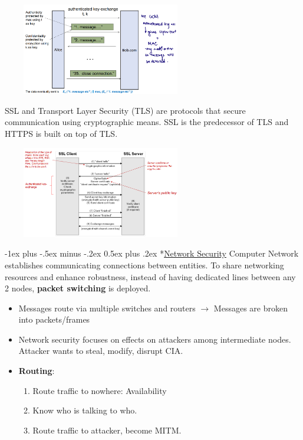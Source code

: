 \documentclass[10pt,landscape]{article}
\makeatletter
\renewcommand{\section}{\@startsection{section}{1}{0mm}%
                                {-1ex plus -.5ex minus -.2ex}%
                                {0.5ex plus .2ex}%
                                {\normalfont\large\bfseries}}
\makeatother
\begin{document}
\begin{multicols*}{3}
\includegraphics[width=8.6cm, height=4cm]{images/tls.png} 

SSL and Transport Layer Security (TLS) are protocols that secure communication using cryptographic means.
SSL is the predecessor of TLS and HTTPS is built on top of TLS.

\includegraphics[width=8.6cm, height=4cm]{images/TLShandshake.png} 

\section*{\underline{Network Security}}
Computer Network establishes communicating connections between entities. To share networking resources 
and enhance robustness, instead of having dedicated lines between any 2 nodes, \textbf{packet switching} is deployed.
\begin{itemize}[noitemsep,wide=0pt, leftmargin=\dimexpr{} + 2\relax]
    \item Messages route via multiple switches and routers $\rightarrow$ Messages are broken into packets/frames
    \item Network security focuses on effects on attackers among intermediate nodes. Attacker wants to steal, modify, disrupt CIA.
    \item \textbf{Routing}:
    \begin{enumerate}[noitemsep,wide=0pt, leftmargin=\dimexpr\labelwidth + 2\labelsep\relax]
        \item Route traffic to nowhere: Availability
        \item Know who is talking to who.
        \item Route traffic to attacker, become MITM. 
    \end{enumerate}
\end{itemize}


\end{multicols*}
\end{document}
